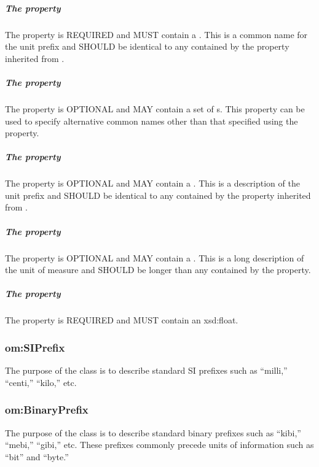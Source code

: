 \subparagraph{The  property}\label{sec:om:label:Prefix}
The  property is REQUIRED and MUST contain a . This  is a common name for the unit prefix and SHOULD be identical to any  contained by the  property inherited from .

\subparagraph{The  property}\label{sec:om:alternativeLabels:Prefix}
The  property is OPTIONAL and MAY contain a set of s. This property can be used to specify alternative common names other than that specified using the  property.

\subparagraph{The  property}\label{sec:om:comment:Prefix}
The  property is OPTIONAL and MAY contain a . This  is a description of the unit prefix and SHOULD be identical to any  contained by the  property inherited from .

\subparagraph{The  property}\label{sec:om:longcomment:Prefix}
The  property is OPTIONAL and MAY contain a . This  is a long description of the unit of measure and SHOULD be longer than any  contained by the  property.

\subparagraph{The  property}\label{sec:om:hasFactor:Prefix}
The  property is REQUIRED and MUST contain an xsd:float.

\subsubsection{om:SIPrefix}
\label{sec:om:SIPrefix}

The purpose of the  class is to describe standard SI prefixes such as ``milli,'' ``centi,'' ``kilo,'' etc. 

\subsubsection{om:BinaryPrefix}
\label{sec:om:BinaryPrefix}

The purpose of the  class is to describe standard binary prefixes such as ``kibi,'' ``mebi,'' ``gibi,'' etc. These prefixes commonly precede units of information such as ``bit'' and ``byte.''

